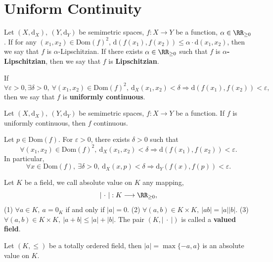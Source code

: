 \section{Uniform Continuity}
\begin{definitionenv}
    Let $(X, \mathrm{d}_X),\ (Y,\mathrm{d}_Y)$ be semimetric spaces, $f:X\longrightarrow Y$ be a function, $\alpha \in \RR_{\ge0}$. If for any $(x_1,x_2)\in \mathrm{Dom}(f)^2$, $\mathrm{d}\left(f(x_1),f(x_2)\right)\le \alpha\cdot \mathrm{d}(x_1,x_2)$, then we say that $f$ is $\alpha$-Lipschitzian. If there exists $\alpha\in \RR_{\ge 0}$ such that $f$ is \textbf{$\alpha$-Lipschitzian}, then we say that $f$ is \textbf{Lipschitzian}. 

    If 
    $$\forall \varepsilon>0,\exists \delta>0,\ \forall (x_1,x_2)\in \mathrm{Dom}(f)^2,\ \mathrm{d}_X(x_1,x_2)<\delta\Rightarrow \mathrm{d}(f(x_1),f(x_2))<\varepsilon,$$
    then we say that $f$ is \textbf{uniformly continuous}.
\end{definitionenv}
\begin{propositionenv}
    Let $(X,\mathrm{d}_X),\ (Y,\mathrm{d}_Y)$ be semimetric spaces, $f:X\longrightarrow Y$ be a function. If $f$ is uniformly continuous, then $f$ continuous.
\end{propositionenv}
\begin{proofenv}
Let $p\in \mathrm{Dom}(f)$. For $\varepsilon>0$, there exists $\delta>0$ such that 
$$\forall (x_1,x_2)\in \mathrm{Dom}(f)^2,\ \mathrm{d}_X(x_1,x_2)<\delta\Rightarrow \mathrm{d}(f(x_1),f(x_2))<\varepsilon.$$
In particular, 
$$\forall x\in \mathrm{Dom}(f),\ \exists \delta>0,\ \mathrm{d}_X(x,p)<\delta\Rightarrow \mathrm{d}_Y(f(x),f(p))<\varepsilon.$$
\end{proofenv}
\begin{definitionenv}
    Let $K$ be a field, we call absolute value on $K$ any mapping,
    $$\left|\ \cdot\ \right|: K\longrightarrow \RR_{\ge 0},$$
    (1) $\forall a\in K,\ a=0_K$ if and only if $\left|a\right|=0.$
    \newline
    (2) $\forall (a,b)\in K\times K,\ \left|ab\right|=\left|a\right|\left|b\right|.$
    \newline
    (3) $\forall (a,b)\in K\times K,\ \left|a+b\right|\le \left|a\right|+\left|b\right|.$
    \newline
    The pair $(K,\left|\ \cdot\ \right|)$ is called a \textbf{valued field}.

\end{definitionenv}
\begin{exampleenv}
    Let $(K,\le)$ be a totally ordered field, then $\left|a\right|=\max\{-a,a\}$ is an absolute value on $K$.
\end{exampleenv}

